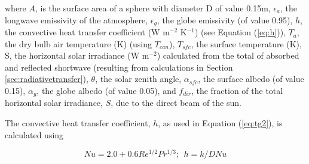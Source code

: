 \documentclass[final,3p,times,authoryear]{elsarticle}
\begin{document}
where $A$, is the surface area of a sphere with diameter D of value 0.15m,
$\epsilon_{a}$, the longwave emissivity of the atmosphere, 
$\epsilon_{g}$, the globe emissivity (of value 0.95), 
$h$, the convective heat transfer coefficient (W m$^{-2}$ K$^{-1}$) (see Equation (\ref{eq:h})), 
$T_{a}$, the dry bulb air temperature (K) (using $T_{can}$), 
$T_{sfc}$, the surface temperature (K), 
S, the horizontal solar irradiance (W m$^{-2}$) calculated from the total of absorbed and reflected shortwave (resulting from calculations in Section \ref{sec:radiativetransfer}), 
$\theta$, the solar zenith angle, 
$\alpha_{sfc}$, the surface albedo (of value 0.15),  
$\alpha_{g}$, the globe albedo (of value 0.05), and 
$f_{dir}$, the fraction of the total horizontal solar irradiance, $S$, due to the direct
beam of the sun. 


%
%
%
%

The convective heat transfer coefficient, $h$, as used in Equation (\ref{eq:tg2}), is calculated using 

\begin{equation}\label{eq:h}
Nu = 2.0 + 0.6Re^{1/2}Pr^{1/3};  ~~h = k / D Nu
\end{equation}
\end{document}
